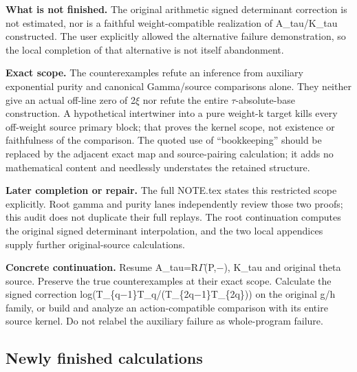 \documentclass[10pt,a4paper,oneside]{report}
\begin{document}
\textbf{What is not finished.} The original arithmetic signed
determinant correction is not estimated, nor is a faithful
weight-compatible realization of A\_tau/K\_tau constructed. The user
explicitly allowed the alternative failure demonstration, so the local
completion of that alternative is not itself abandonment.

\textbf{Exact scope.} The counterexamples refute an inference from
auxiliary exponential purity and canonical Gamma/source comparisons
alone. They neither give an actual off-line zero of
2\allowbreak{}\ensuremath{ξ}\allowbreak{} nor refute the entire
\allowbreak{}\ensuremath{τ}\allowbreak{}-absolute-base construction. A
hypothetical intertwiner into a pure weight-k target kills every
off-weight source primary block; that proves the kernel scope, not
existence or faithfulness of the comparison. The quoted use of
``bookkeeping'' should be replaced by the adjacent exact map and
source-pairing calculation; it adds no mathematical content and
needlessly understates the retained structure.

\textbf{Later completion or repair.} The full NOTE.tex states this
restricted scope explicitly. Root gamma and purity lanes independently
review those two proofs; this audit does not duplicate their full
replays. The root continuation computes the original signed determinant
interpolation, and the two local appendices supply further
original-source calculations.

\textbf{Concrete continuation.} Resume
A\_tau=R\allowbreak{}\ensuremath{Γ}\allowbreak{}(P,\allowbreak{}\ensuremath{−}\allowbreak{}),
K\_tau and original theta source. Preserve the true counterexamples at
their exact scope. Calculate the signed correction
log(T\_\{q\allowbreak{}\ensuremath{−}\allowbreak{}1\}T\_q/(T\_\{2q\allowbreak{}\ensuremath{−}\allowbreak{}1\}T\_\{2q\}))
on the original g/h family, or build and analyze an action-compatible
comparison with its entire source kernel. Do not relabel the auxiliary
failure as whole-program failure.

\subsection{Newly finished
calculations}\label{newly-finished-calculations}
\end{document}
